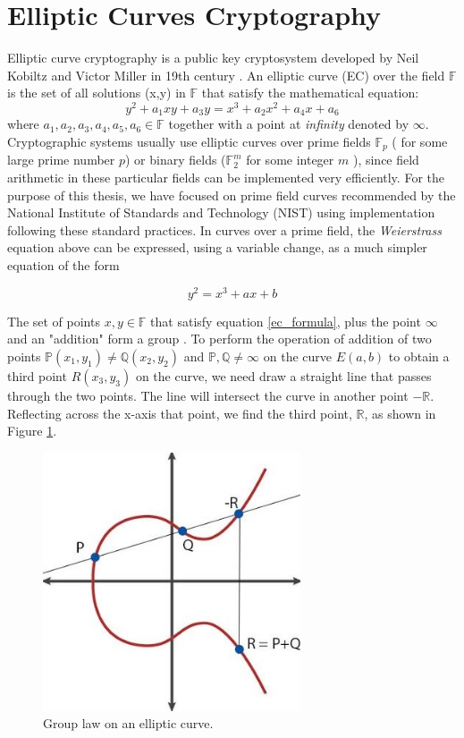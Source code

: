 \section{Elliptic Curves Cryptography}
\label{theory:ECC}
Elliptic curve cryptography is a public key cryptosystem developed by Neil Kobiltz and Victor Miller in 19th century \cite{Miller2000TheCryptography}.
An elliptic curve (\acs{EC}) over the field $\mathbb{F}$ is the set of all solutions (x,y) in $\mathbb{F}$ that satisfy the mathematical equation:
\begin{equation}
y^2 + a_1xy + a_3 y = x^3 + a_2 x^2 + a_4 x + a_6
\end{equation}
where $a_1,a_2,a_3,a_4,a_5,a_6 \in \mathbb{F}$ together with a point at \textit{infinity} denoted by $\infty$.
Cryptographic systems usually use elliptic curves over prime fields $\mathbb{F}_p$ ( for some large prime number $p$) or binary fields ($\mathbb{F}^m_2$ for some integer $m$ ), since field arithmetic in these particular fields can be implemented very efficiently. 
For the purpose of this thesis, we have focused on prime field curves recommended by the National Institute of Standards and Technology (NIST) using implementation following these standard practices. 
In curves over a prime field, the \textit{Weierstrass} equation above can be expressed, using a variable change, as a much simpler equation of the form

\begin{equation}
y^2 = x^3 + ax + b
\label{ec_formula}
\end{equation}

The set of points $x,y \in \mathbb{F}$ that satisfy equation \ref{ec_formula}, plus the point $\infty$ and an "addition" form a group \cite{Washington2008EllipticApplications}.
To perform the operation of addition of two points $\mathbb{P}(x_1,y_1) \neq \mathbb{Q}(x_2,y_2) $ and  $ \mathbb{P},\mathbb{Q}\neq \infty$ on the curve $E(a, b)$ to obtain a third point $R(x_3, y_3)$ on the curve, we need draw a straight line that passes through the two points. 
The line will intersect the curve in another point $-\mathbb{R}$. 
Reflecting across the x-axis that point, we find the third point, $\mathbb{R}$, as shown in Figure \ref{fig_ec}. 

\begin{figure}[!h]
\centering
\includegraphics[width=3in]{images/ecc.png}
\caption{Group law on an elliptic curve.}
\label{fig_ec}
\end{figure}

